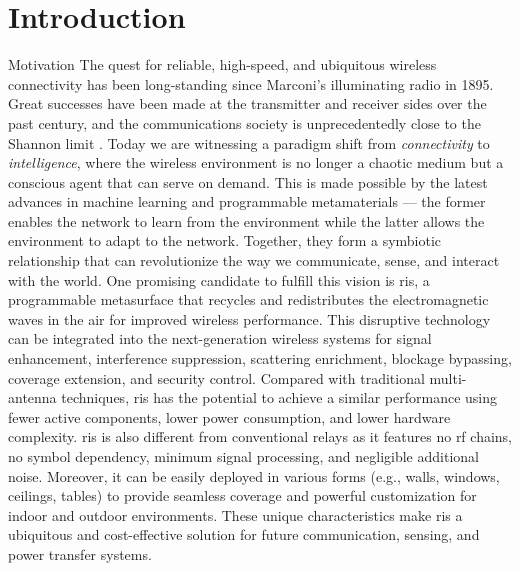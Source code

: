 
\graphicspath{{assets/chapter_1/}}

\chapter{Introduction}

\begin{section}{Motivation}
	The quest for reliable, high-speed, and ubiquitous wireless connectivity has been long-standing since Marconi's illuminating radio in 1895.
	Great successes have been made at the transmitter and receiver sides over the past century, and the communications society is unprecedentedly close to the Shannon limit \cite{Shannon1948}.
	Today we are witnessing a paradigm shift from \emph{connectivity} to \emph{intelligence}, where the wireless environment is no longer a chaotic medium but a conscious agent that can serve on demand.
	This is made possible by the latest advances in machine learning and programmable metamaterials --- the former enables the network to learn from the environment while the latter allows the environment to adapt to the network.
	Together, they form a symbiotic relationship that can revolutionize the way we communicate, sense, and interact with the world.
	One promising candidate to fulfill this vision is \gls{ris}, a programmable metasurface that recycles and redistributes the electromagnetic waves in the air for improved wireless performance.
	This disruptive technology can be integrated into the next-generation wireless systems for signal enhancement, interference suppression, scattering enrichment, blockage bypassing, coverage extension, and security control.
	Compared with traditional multi-antenna techniques, \gls{ris} has the potential to achieve a similar performance using fewer active components, lower power consumption, and lower hardware complexity.
	\gls{ris} is also different from conventional relays as it features no \gls{rf} chains, no symbol dependency, minimum signal processing, and negligible additional noise.
	Moreover, it can be easily deployed in various forms (e.g., walls, windows, ceilings, tables) to provide seamless coverage and powerful customization for indoor and outdoor environments.
	These unique characteristics make \gls{ris} a ubiquitous and cost-effective solution for future communication, sensing, and power transfer systems.


\end{section}
